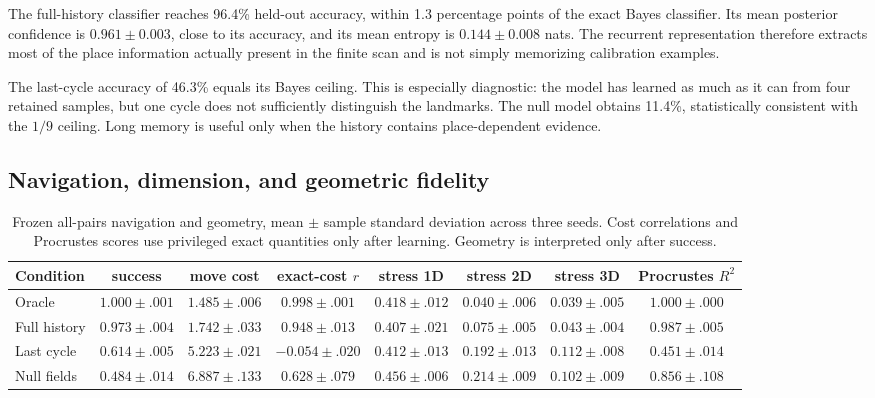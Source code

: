 \documentclass[11pt]{article}
\begin{document}
The full-history classifier reaches 96.4\% held-out accuracy, within 1.3
percentage points of the exact Bayes classifier. Its mean posterior confidence
is $0.961\pm0.003$, close to its accuracy, and its mean entropy is
$0.144\pm0.008$ nats. The recurrent representation therefore extracts most of
the place information actually present in the finite scan and is not simply
memorizing calibration examples.

The last-cycle accuracy of 46.3\% equals its Bayes ceiling. This is especially
diagnostic: the model has learned as much as it can from four retained samples,
but one cycle does not sufficiently distinguish the landmarks. The null model
obtains 11.4\%, statistically consistent with the $1/9$ ceiling. Long memory is
useful only when the history contains place-dependent evidence.

\subsection{Navigation, dimension, and geometric fidelity}

\begin{table}[t]
\centering
\caption{Frozen all-pairs navigation and geometry, mean $\pm$ sample standard
deviation across three seeds. Cost correlations and Procrustes scores use
privileged exact quantities only after learning. Geometry is interpreted only
after success.}
\label{tab:atlas-navigation}
\scriptsize
\setlength{\tabcolsep}{3.5pt}
\begin{tabular}{lccccccc}
\toprule
Condition & success & move cost & exact-cost $r$ & stress 1D & stress 2D & stress 3D & Procrustes $R^2$\\
\midrule
Oracle & $1.000\pm.001$ & $1.485\pm.006$ & $0.998\pm.001$ & $0.418\pm.012$ & $0.040\pm.006$ & $0.039\pm.005$ & $1.000\pm.000$\\
Full history & $\mathbf{0.973\pm.004}$ & $1.742\pm.033$ & $\mathbf{0.948\pm.013}$ & $0.407\pm.021$ & $\mathbf{0.075\pm.005}$ & $0.043\pm.004$ & $\mathbf{0.987\pm.005}$\\
Last cycle & $0.614\pm.005$ & $5.223\pm.021$ & $-0.054\pm.020$ & $0.412\pm.013$ & $0.192\pm.013$ & $0.112\pm.008$ & $0.451\pm.014$\\
Null fields & $0.484\pm.014$ & $6.887\pm.133$ & $0.628\pm.079$ & $0.456\pm.006$ & $0.214\pm.009$ & $0.102\pm.009$ & $0.856\pm.108$\\
\bottomrule
\end{tabular}
\end{table}
\end{document}
